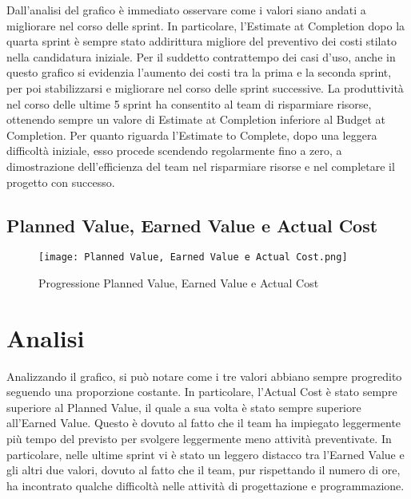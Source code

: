 Dall’analisi del grafico è immediato osservare come i valori siano andati a migliorare
nel corso delle sprint. In particolare, l’Estimate at Completion dopo la quarta sprint
è sempre stato addirittura migliore del preventivo dei costi stilato nella candidatura iniziale. Per il suddetto
contrattempo dei casi d'uso, anche in questo grafico si evidenzia l'aumento dei costi tra la prima
e la seconda sprint, per poi stabilizzarsi e migliorare nel corso delle sprint successive. La produttività nel corso delle ultime 5 sprint ha consentito al team di risparmiare risorse, ottenendo sempre un valore di Estimate at Completion inferiore al Budget at Completion. Per quanto riguarda l'Estimate to Complete, dopo una leggera difficoltà iniziale, esso procede scendendo regolarmente fino a zero, a dimostrazione dell'efficienza del team nel risparmiare risorse e nel completare il progetto con successo.

\newpage

\subsection{Planned Value, Earned Value e Actual Cost}
\label{subsec:Planned Value, Earned Value e Actual Cost}

\begin{figure}[h] 
    \centering
    \texttt{[image: Planned Value, Earned Value e Actual Cost.png]}
    \caption{Progressione Planned Value, Earned Value e Actual Cost} 
    \label{fig: Planned Value, Earned Value e Actual Cost}
\end{figure}

\section*{Analisi}

Analizzando il grafico, si può notare come i tre valori abbiano sempre progredito seguendo una
proporzione costante. In particolare, l’Actual Cost è stato sempre superiore al Planned Value,
il quale a sua volta è stato sempre superiore all’Earned Value. Questo è dovuto al fatto che
il team ha impiegato leggermente più tempo del previsto per svolgere leggermente meno attività preventivate.  
In particolare, nelle ultime sprint vi è stato un leggero distacco tra l'Earned Value e gli altri due valori, dovuto al fatto che il team, pur rispettando il numero di ore, ha incontrato qualche difficoltà nelle attività di progettazione e programmazione.

\newpage

